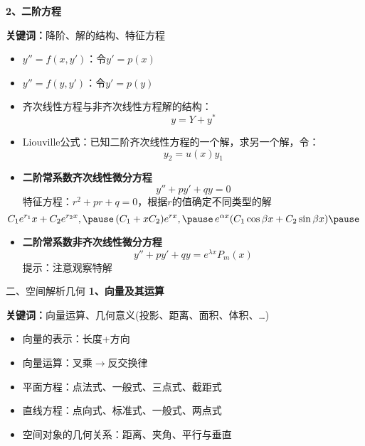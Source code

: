 \begin{frame}
	\linespread{1.2}
	{\bf 2、二阶方程}\pause 
	
	{\b{\bf 关键词：}\pause 降阶、\pause 解的结构、\pause 特征方程}\pause 
	\begin{itemize}
	  \item $y''=f(x,y')$：\pause 令$y'=p(x)$\pause 
	  \item $y''=f(y,y')$：\pause 令$y'=p(y)$\pause 
	  \item 齐次线性方程与非齐次线性方程解的结构：
	  $$y=Y+y^*$$\pause 
	  \vspace{-1em}
	  \item Liouville公式：已知二阶齐次线性方程的一个解，求另一个解，令：
	  $$y_2=u(x)y_1$$
	\end{itemize}
\end{frame}

\begin{frame}
	\linespread{1.2}
	\begin{itemize}
	  \item {\bf 二阶常系数齐次线性微分方程}\pause 
	  $$y''+py'+qy=0$$\pause 
	  特征方程：$r^2+pr+q=0$，\pause 根据$r$的值确定不同类型的解\pause 
	  $$\hspace{-2em}C_1e^{r_1}x+C_2e^{r_2x},\pause \,(C_1+xC_2)e^{rx},\pause
	  \,e^{\alpha x} (C_1\cos\beta x+C_2\sin\beta x)\pause $$
	  \item {\bf 二阶常系数非齐次线性微分方程}\pause 
	  $$y''+py'+qy=e^{\lambda x}P_m(x)$$
	  \pause 提示：注意观察特解
	\end{itemize}
\end{frame}

\begin{frame}{二、空间解析几何}
	\linespread{1.2}\pause 
	{\bf 1、向量及其运算}\pause 
	
	{\b{\bf 关键词：}\pause 向量运算、\pause 几何意义\pause (投影、距离、面积、体积、\ldots)}\pause 
	\begin{itemize}
	  \item 向量的表示：\pause 长度+方向\pause 
	  \item 向量运算：\pause 叉乘$\to$反交换律\pause 
	  \item 平面方程：\pause 点法式、\pause 一般式、\pause 三点式、\pause 截距式\pause 
	  \item 直线方程：\pause 点向式、\pause 标准式、\pause 一般式、\pause 两点式\pause 
	  \item 空间对象的几何关系：\pause 距离、\pause 夹角、\pause 平行与垂直
	\end{itemize}
\end{frame}

